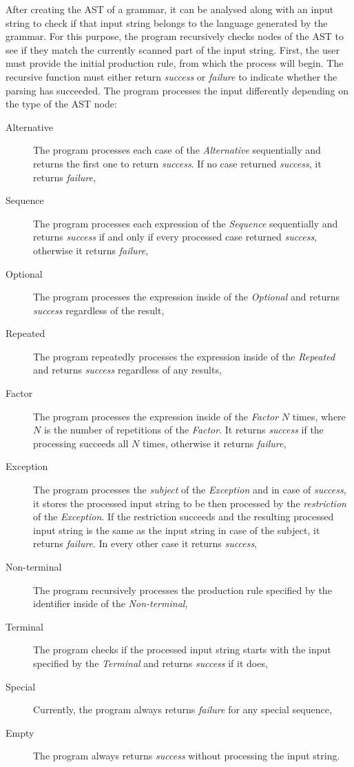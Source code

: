 \documentclass[english,engineering]{wizthesis}
\begin{document}
After creating the AST of a grammar, it can be analysed along with an input
string to check if that input string belongs to the language generated by the
grammar. For this purpose, the program recursively checks nodes of the AST to
see if they match the currently scanned part of the input string. First, the
user must provide the initial production rule, from which the process will
begin. The recursive function must either return \emph{success} or
\emph{failure} to indicate whether the parsing has succeeded. The program
processes the input differently depending on the type of the AST node:
\begin{description}
  \item[Alternative] The program processes each case of the \emph{Alternative}
  sequentially and returns the first one to return \emph{success}. If no case
  returned \emph{success}, it returns \emph{failure},
  \item[Sequence] The program processes each expression of the \emph{Sequence}
  sequentially and returns \emph{success} if and only if every processed case
  returned \emph{success}, otherwise it returns \emph{failure},
  \item[Optional] The program processes the expression inside of the
  \emph{Optional} and returns \emph{success} regardless of the result,
  \item[Repeated] The program repeatedly processes the expression inside of the
  \emph{Repeated} and returns \emph{success} regardless of any results,
  \item[Factor] The program processes the expression inside of the \emph{Factor}
  $N$ times, where $N$ is the number of repetitions of the \emph{Factor}. It
  returns \emph{success} if the processing succeeds all $N$ times, otherwise it
  returns \emph{failure},
  \item[Exception] The program processes the \emph{subject} of the
  \emph{Exception} and in case of \emph{success}, it stores the processed input
  string to be then processed by the \emph{restriction} of the \emph{Exception}.
  If the restriction succeeds and the resulting processed input string is the
  same as the input string in case of the subject, it returns \emph{failure}.
  In every other case it returns \emph{success},
  \item[Non-terminal] The program recursively processes the production rule
  specified by the identifier inside of the \emph{Non-terminal},
  \item[Terminal] The program checks if the processed input string starts with
  the input specified by the \emph{Terminal} and returns \emph{success} if it
  does,
  \item[Special] Currently, the program always returns \emph{failure} for any
  special sequence,
  \item[Empty] The program always returns \emph{success} without processing the
  input string.
\end{description}
\end{document}
